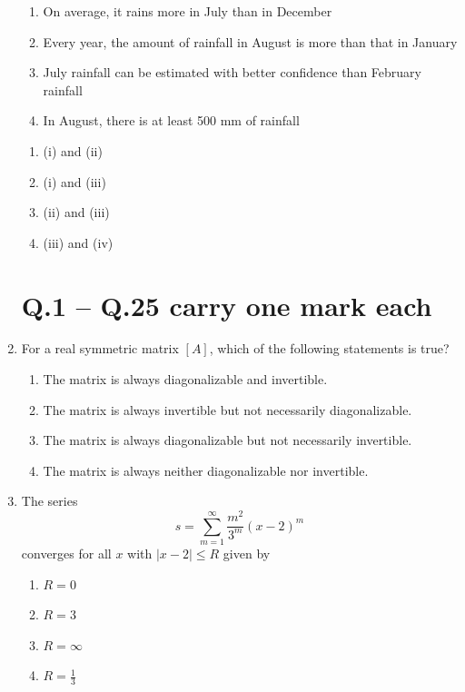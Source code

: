 \documentclass[journal]{IEEEtran}
\begin{document}
\begin{enumerate}
\begin{enumerate}
    \item On average, it rains more in July than in December
    \item Every year, the amount of rainfall in August is more than that in January
    \item July rainfall can be estimated with better confidence than February rainfall
    \item In August, there is at least 500 mm of rainfall
\end{enumerate}


\begin{enumerate}
    \item (i) and (ii)
    \item (i) and (iii)
    \item (ii) and (iii)
    \item (iii) and (iv)
    
\end{enumerate}

\hfill{}

\section*{Q.1 -- Q.25 carry one mark each}

\item For a real symmetric matrix \([A]\), which of the following statements is true?

\begin{enumerate}
    \item The matrix is always diagonalizable and invertible.
    \item The matrix is always invertible but not necessarily diagonalizable.
    \item The matrix is always diagonalizable but not necessarily invertible.
    \item The matrix is always neither diagonalizable nor invertible.
\end{enumerate}
\hfill{}

\item The series 
\[
s = \sum_{m=1}^{\infty} \frac{m^{2}}{3^{m}} (x - 2)^{m}
\]
converges for all \(x\) with \(|x - 2| \le R\) given by

\begin{enumerate}
    \item \(R = 0\)
    \item \(R = 3\)
    \item \(R = \infty\)
    \item \(R = \frac{1}{3}\)
\end{enumerate}
\hfill{}


\end{enumerate}
\end{document}
